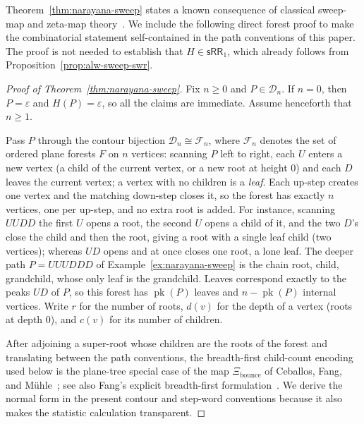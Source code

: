\documentclass[11pt]{article}
\theoremstyle{definition}
\newcommand{\D}{\mathcal D}
\newcommand{\SWR}{\mathsf{sRR}_1}
\newcommand{\pk}{\operatorname{pk}}
\begin{document}
Theorem~\ref{thm:narayana-sweep} states a known consequence of classical
sweep-map and zeta-map theory~\cite{ThomasWilliams2018,CeballosFangMuhle2020,
Fang2024,SulzgruberThiel2018}.  We include the following direct forest proof to
make the combinatorial statement self-contained in the path conventions of
this paper.  The proof is not needed to establish that $H\in\SWR$, which
already follows from Proposition~\ref{prop:alw-sweep-swr}.

\begin{proof}[Proof of Theorem~\ref{thm:narayana-sweep}]
Fix $n\ge 0$ and $P\in\D_n$.  If $n=0$, then $P=\varepsilon$ and
$H(P)=\varepsilon$, so all the claims are immediate.  Assume henceforth that
$n\ge 1$.

Pass $P$ through the contour bijection $\D_n\cong\mathcal F_n$, where
$\mathcal F_n$ denotes the set of ordered plane forests $F$ on $n$ vertices:
scanning $P$ left to right, each $U$ enters a new
vertex (a child of the current vertex, or a new root at height $0$) and each $D$
leaves the current vertex; a vertex with no children is a \emph{leaf}.  Each
up-step creates one vertex and the matching down-step closes it, so the forest
has exactly $n$ vertices, one per up-step, and no extra root is added.  For
instance, scanning $UUDD$ the first $U$ opens a root, the second $U$ opens a
child of it, and the two $D$'s close the child and then the root, giving a root
with a single leaf child (two vertices); whereas $UD$ opens and at once closes
one root, a lone leaf.  The deeper path $P=UUUDDD$ of
Example~\ref{ex:narayana-sweep} is the chain root, child, grandchild, whose only
leaf is the grandchild.  Leaves correspond exactly to the peaks $UD$ of $P$, so
this forest has $\pk(P)$ leaves and $n-\pk(P)$ internal vertices.  Write $r$ for
the number of roots, $d(v)$ for the depth of a vertex (roots at depth $0$), and
$c(v)$ for its number of children.

After adjoining a super-root whose children are the roots of the forest and
translating between the path conventions, the breadth-first child-count
encoding used below is the plane-tree special case of the map
$\Xi_{\mathrm{bounce}}$ of Ceballos, Fang, and
M\"uhle~\cite[Section~3.3]{CeballosFangMuhle2020}; see also Fang's explicit
breadth-first formulation~\cite[Construction~3.6 and
Proposition~3.7]{Fang2024}.  We derive the normal form in the present contour
and step-word conventions because it also makes the statistic calculation
transparent.


\end{proof}
\end{document}
